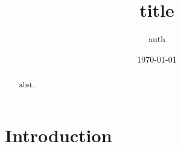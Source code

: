 \documentclass[a4j,uplatex,twocolumn,english]{jsarticle}%
\begin{document}
\title{title}
\author{auth}
\date{\today}
\begin{abstract}
abst.
\end{abstract}
\maketitle
\section{Introduction}\label{shoron}
\newrefcontext[sorting=mysorting]
\printbibliography
\end{document}
